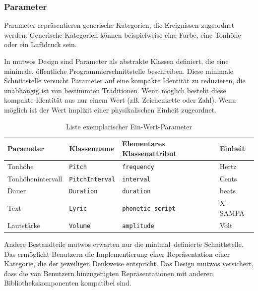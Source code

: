 \documentclass[12pt,a4paper,ngerman]{article}
\begin{document}
\subsubsection{Parameter}

Parameter repräsentieren generische Kategorien, die Ereignissen zugeordnet werden.
Generische Kategorien können beispielweise eine Farbe, eine Tonhöhe oder ein Luftdruck sein.

In mutwos Design sind Parameter als abstrakte Klassen definiert, die eine minimale, öffentliche Programmierschnittstelle beschreiben.
Diese minimale Schnittstelle versucht Parameter auf eine kompakte Identität zu reduzieren, die unabhängig ist von bestimmten Traditionen.
Wenn möglich besteht diese kompakte Identität aus nur einem Wert (zB. Zeichenkette oder Zahl).
Wenn möglich ist der Wert implizit einer physikalischen Einheit zugeordnet.

\begin{table}[h!]
    \begin{center}
        \begin{tabular}{l l l l} 
            \hline
            Parameter & Klassenname & Elementares Klassenattribut & Einheit \\ [0.5ex] 
            \hline\hline
            Tonhöhe & \texttt{Pitch} & \texttt{frequency} & Hertz \\ 
            Tonhöhenintervall & \texttt{PitchInterval} & \texttt{interval} & Cents \\ 
            Dauer & \texttt{Duration} & \texttt{duration} & beats \\ 
            Text & \texttt{Lyric} & \texttt{phonetic\_script} & X-SAMPA\footnotemark \\ 
            Lautstärke & \texttt{Volume} & \texttt{amplitude} & Volt \\ [1ex] 
            \hline
        \end{tabular}
    \end{center}

    \caption{Liste exemplarischer Ein-Wert-Parameter}
\end{table}


Andere Bestandteile mutwos erwarten nur die minimal--definierte Schnittstelle.
Das ermöglicht Benutzern die Implementierung einer Repräsentation einer Kategorie, die der jeweiligen Denkweise entspricht.
Das Design mutwos versichert, dass die von Benutzern hinzugefügten Repräsentationen mit anderen Bibliothekskomponenten kompatibel sind.
\end{document}

